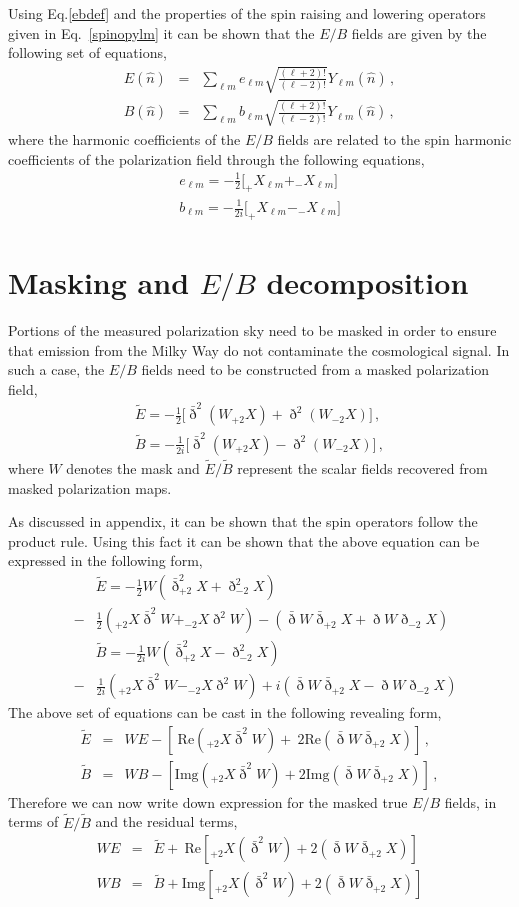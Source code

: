 \documentclass[prd,amsmath,amssymb,floatfix,nofootinbib,preprintnumbers,twocolumn]{revtex4}%
\newcommand{\beqry}{\begin{eqnarray}}
\newcommand{\eeqry}{\end{eqnarray}}
\begin{document}
Using Eq.\ref{ebdef} and the properties of the spin raising and lowering operators given in Eq.~\ref{spinopylm} it can be shown that the $E/B$ fields are given by the following set of equations,
%
\beqry
E(\hat{n})  &=& \sum_{\ell m} e_{\ell m} \sqrt{\frac{(\ell+2)!}{(\ell-2)!}} Y_{\ell m} (\hat{n}) \,, \\
B(\hat{n})  &=& \sum_{\ell m} b_{\ell m} \sqrt{\frac{(\ell+2)!}{(\ell-2)!}} Y_{\ell m} (\hat{n}) \,,
\eeqry
%
where the harmonic coefficients of the $E/B$ fields are related to the spin harmonic coefficients of the polarization field through the following equations,
%
\beqry
e_{\ell m} = -\frac{1}{2} \big[ _+ X_{\ell m} + _- X_{\ell m} \big] \\
b_{\ell m} = -\frac{1}{2i} \big[ _+ X_{\ell m} - _- X_{\ell m} \big] 
\eeqry
%
\section{Masking and $E/B$ decomposition}

Portions of the measured polarization sky need to be masked in order to ensure that emission from the Milky Way do not contaminate the cosmological signal. In such a case, the $E/B$ fields need to be constructed from a masked polarization field,
%
\beqry \label{ebdef}
\tilde{E} = -\frac{1}{2} \big[\bar{\eth}^2 (W{_{+ 2}}X)  +  \eth^2 (W {_{- 2}}X) \big] \,, \\
\tilde{B} = -\frac{1}{2i} \big[ \bar{\eth}^2 (W{_{+ 2}}X)  -  \eth^2 (W{_{- 2}}X)\big] \,,
\eeqry
%
\noindent where $W$ denotes the mask and $\tilde{E}/\tilde{B}$ represent the scalar fields recovered from masked polarization maps.

As discussed in appendix, it can be shown that the spin operators follow the product rule. Using this fact it can be shown that the above equation can be expressed in the following form,
%
\beqry
&&\tilde{E} = -\frac{1}{2}W( \bar{\eth}^2 _{+ 2} X  + \eth^2 _{- 2}X ) \\
 &-& \frac{1}{2} (_{+ 2} X  \bar{\eth}^2 W  + _{- 2}X \eth^2 W ) - (\bar{\eth} W  \bar{\eth} _{+ 2} X + \eth W  \eth  _{- 2} X ) \nonumber \\
 &&\tilde{B} = -\frac{1}{2i}W( \bar{\eth}^2 _{+ 2} X  - \eth^2 _{- 2}X ) \\
 &-& \frac{1}{2i} (_{+ 2} X  \bar{\eth}^2 W  -  _{- 2}X \eth^2 W ) + i (\bar{\eth} W  \bar{\eth} _{+ 2} X - \eth W  \eth  _{- 2} X ) \nonumber
\eeqry
%
The above set of equations can be cast in the following revealing form,
%
\beqry
\tilde{E} &=& WE - [~\mathrm{ Re}(_{+ 2} X  \bar{\eth}^2 W)  +~ 2 \mathrm{ Re}( \bar{\eth} W  \bar{\eth} _{+ 2} X )]\,, \\
\tilde{B} &=& WB -  [\mathrm{Img}(_{+ 2} X  \bar{\eth}^2 W)  + 2\mathrm{Img}(\bar{\eth} W  \bar{\eth} _{+ 2} X)] \,,
\eeqry
%
Therefore we can now write down expression for the masked true $E/B$ fields, in terms of $\tilde{E}/\tilde{B}$ and the residual terms,
%
\beqry \label{res-core-eb}
WE &=& \tilde{E}  +  ~\mathrm{Re}[_{+ 2} X (\bar{\eth}^2 W) +  2(\bar{\eth} W  \bar{\eth} _{+ 2} X)] \\
WB &=& \tilde{B}  + \mathrm{Img}[_{+ 2} X (\bar{\eth}^2 W) +  2(\bar{\eth} W  \bar{\eth} _{+ 2} X)] 
\eeqry
%
\end{document}
